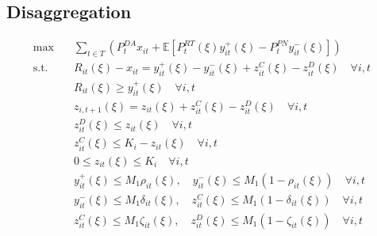 \documentclass[10pt]{article}
\begin{document}
\subsection{Disaggregation}
\begin{subequations}
    \begin{align}
    \text{max} \quad &\sum_{t\in T}\left(P_t^{DA}x_{it} + \mathbb{E}\left[P_t^{RT}(\xi)y_{it}^{+}(\xi) - P_t^{PN}y_{it}^{-}(\xi)\right]\right)&\\    
    \text{s.t.} \quad &R_{it}(\xi) - x_{it} = y_{it}^{+}(\xi) - y_{it}^{-}(\xi) + z^C_{it}(\xi) - z^D_{it}(\xi)\quad  \forall i, t &\\ 
    &R_{it}(\xi) \geq y^+_{it}(\xi) \quad \forall i ,t &\\
    &z_{i,t+1}(\xi) = z_{it}(\xi) + z^C_{it}(\xi) - z^D_{it}(\xi) \quad \forall i, t &\\
    &z^D_{it}(\xi) \le z_{it}(\xi) \quad \forall i, t &\\
    &z^C_{it}(\xi) \le K_i-z_{it}(\xi) \quad \forall i, t &\\
    &0 \leq z_{it}(\xi) \leq K_i \quad \forall i, t &\\
    &y^+_{it}(\xi) \leq M_1 \rho_{it}(\xi), \quad y^-_{it}(\xi) \leq M_1 (1 - \rho_{it}(\xi)) \quad \forall i, t &\\
    &y^-_{it}(\xi) \leq M_1 \delta_{it}(\xi), \quad z^C_{it}(\xi) \leq M_1 (1 - \delta_{it}(\xi)) \quad \forall i, t &\\
    &z^C_{it}(\xi) \leq M_1 \zeta_{it}(\xi), \quad z^D_{it}(\xi) \leq M_1 (1 - \zeta_{it}(\xi)) \quad \forall i, t &
    \end{align}
\end{subequations}
\end{document}
